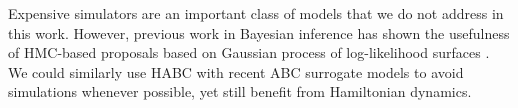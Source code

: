\documentclass[]{article}
\begin{document}

Expensive simulators are an important class of models that we do not address in this work.  However, previous work in Bayesian inference has shown the usefulness of HMC-based proposals based on Gaussian process of log-likelihood surfaces \cite{rasmussen:2003}.   We could similarly use HABC with recent ABC surrogate models \cite{Meeds2014GpsUai,wilkinson:2014} to avoid simulations whenever possible, yet still  benefit from Hamiltonian dynamics.  

\clearpage


\end{document}
